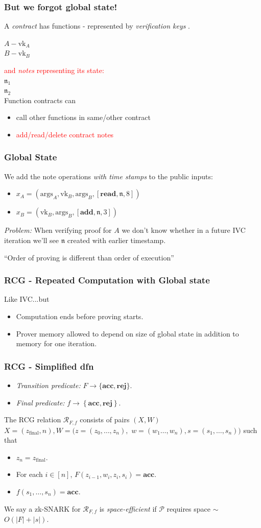 \documentclass[shadesubsections,compress,14pt,mathserif]{beamer}
\newcommand{\set}[1]{\ensuremath{\left\{#1\right\}}}
\newcommand{\prv}{\ensuremath{\mathcal{P}}}
\newcommand{\acc}{{\mathbf{acc}}}
\newcommand{\rej}{{\mathbf{rej}}}
\newcommand{\nl}{\\ \pause \vspace{0.2in}}
\newcommand{\nlnp}{\\ \vspace{0.2in}}
\newcommand{\zfin}{\ensuremath{z_{\mathrm{final}}}}
\newcommand{\rel}{\ensuremath{\mathcal{R}}}
\newcommand{\vk}{\ensuremath{\mathrm{vk} }}
\newcommand{\add}{\ensuremath{\mathbf{add} }}
\renewcommand{\read}{\ensuremath{\mathbf{read} }}
\renewcommand{\note}{\ensuremath{\mathfrak{n} }}
\newcommand{\args}{\ensuremath{\mathrm{args} }}
\begin{document}
\begin{frame}
 \frametitle{ But we forgot global state! }
A \emph{contract} has functions - represented by \emph{verification keys} .\nlnp

$A - \vk_A$\\
$B - \vk_B$\nlnp

{\textcolor{red}{and \emph{notes} representing its state:}}\\
$\note_1$\\
$\note_2$\nl
Function contracts can 
\begin{itemize}
 \item call other functions in same/other contract
 \item \textcolor{red}{add/read/delete contract notes}
 \end{itemize}
 \end{frame}
\begin{frame}
 \frametitle{Global State}
 We add the  note operations \emph{with time stamps} to the public inputs:
 \begin{itemize}
\item $x_A=(\args_A,\vk_B,\args_B,[\read,\note,8])$
\item $x_B=(\vk_B,\args_B,[\add,\note,3])$\nl
\end{itemize} 
 \emph{Problem:} When verifying proof for $A$ we don't know whether in a future IVC iteration we'll see $\note$ created with earlier timestamp.\nl
 
 
 {\selectfont ``Order of proving is different than order of execution''}
\end{frame}
\begin{frame}
 \frametitle{RCG - Repeated Computation with Global state}
 Like IVC...but\pause
 \begin{itemize}
  \item Computation ends before proving starts.\pause
  \item Prover memory allowed to depend on size of global state in addition to memory for one iteration.
 \end{itemize}

\end{frame}
\begin{frame}
 \frametitle{RCG - Simplified dfn}\pause
\noindent
\begin{itemize}
\item \emph{Transition predicate:} $F\to \{\acc,\rej\}$. 
\item \emph{Final predicate:} $f\to \set{\acc,\rej}$.\pause
\end{itemize}
The RCG relation $\rel_{F,f}$ consists of pairs $(X,W)$ 
$X=(\zfin,n),W=(z=(z_0,\ldots,z_n),$ $w=(w_1\ldots,w_n),s=(s_1,\ldots,s_n))$ such that\pause
\begin{itemize}
 \item $z_n=\zfin$.\pause
 \item For each $i\in [n]$, $F(z_{i-1},w_i,z_i,s_i)=\acc$.\pause
 \item $f(s_1,\ldots,s_n)=\acc$.\pause
\end{itemize}


We say a zk-SNARK for $\rel_{F,f}$ is \emph{space-efficient} if $\prv$ requires space $\sim$ $O(|F|+|s|)$.
\end{frame}
\end{document}
